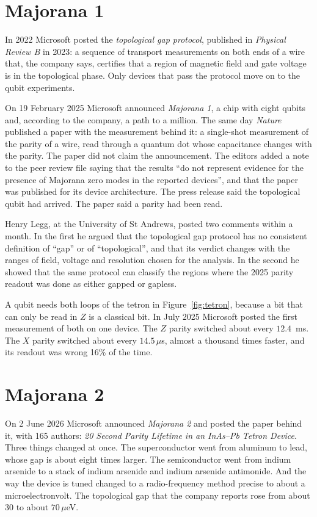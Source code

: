 \section{Majorana 1}

In 2022 Microsoft posted the \emph{topological gap protocol}, published in \emph{Physical
Review B} in 2023: a sequence of transport measurements on both ends of a wire that, the
company says, certifies that a region of magnetic field and gate voltage is in the
topological phase. Only devices that pass the protocol move on to the qubit experiments.

On 19 February 2025 Microsoft announced \emph{Majorana 1}, a chip with eight qubits and,
according to the company, a path to a million. The same day \emph{Nature} published a
paper with the measurement behind it: a single-shot measurement of the parity of a wire,
read through a quantum dot whose capacitance changes with the parity. The paper did not
claim the announcement. The editors added a note to the peer review file saying that the
results ``do not represent evidence for the presence of Majorana zero modes in the reported
devices'', and that the paper was published for its device architecture. The press release
said the topological qubit had arrived. The paper said a parity had been read.

Henry Legg, at the University of St Andrews, posted two comments within a month. In the
first he argued that the topological gap protocol has no consistent definition of
``gap'' or of ``topological'', and that its verdict changes with the ranges of field,
voltage and resolution chosen for the analysis. In the second he showed that the same
protocol can classify the regions where the 2025 parity readout was done as either gapped
or gapless.

A qubit needs both loops of the tetron in Figure~\ref{fig:tetron}, because a bit that can
only be read in $Z$ is a classical bit. In July 2025 Microsoft posted the first measurement
of both on one device. The $Z$ parity switched about every $12.4$~ms. The $X$ parity
switched about every $14.5\,\mu$s, almost a thousand times faster, and its readout was wrong
16\% of the time.

\section{Majorana 2}\label{sec:majorana2}

On 2 June 2026 Microsoft announced \emph{Majorana 2} and posted the paper behind it, with 165
authors: \emph{20 Second Parity Lifetime in an InAs--Pb Tetron Device}. Three things changed
at once. The superconductor went from aluminum to lead, whose gap is about eight times larger.
The semiconductor went from indium arsenide to a stack of indium arsenide and indium arsenide
antimonide. And the way the device is tuned changed to a radio-frequency method precise to
about a microelectronvolt. The topological gap that the company reports rose from about 30 to
about $70\,\mu$eV.

